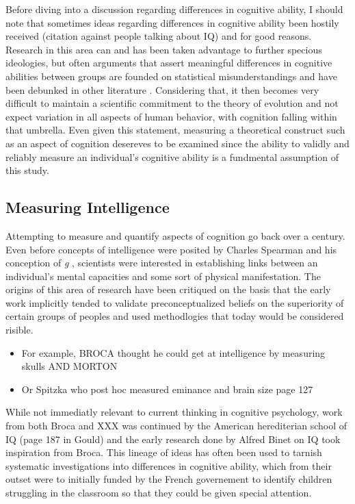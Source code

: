 \documentclass[]{book}
\providecommand{\tightlist}{%
  \setlength{\itemsep}{0pt}\setlength{\parskip}{0pt}}
\theoremstyle{definition}
\theoremstyle{definition}
\theoremstyle{definition}
\theoremstyle{remark}
\begin{document}
Before diving into a discussion regarding differences in cognitive
ability, I should note that sometimes ideas regarding differences in
cognitive ability been hostily received (citation against people talking
about IQ) and for good reasons. Research in this area can and has been
taken advantage to further specious ideologies, but often arguments that
assert meaningful differences in cognitive abilities between groups are
founded on statistical misunderstandings and have been debunked in other
literature \citep{gouldMismeasureMan1996}. Considering that, it then
becomes very difficult to maintain a scientific commitment to the theory
of evolution \citep{darwinOriginSpecies1859} and not expect variation in
all aspects of human behavior, with cognition falling within that
umbrella. Even given this statement, measuring a theoretical construct
such as an aspect of cognition desereves to be examined since the
ability to validly and reliably measure an individual's cognitive
ability is a fundmental assumption of this study.

\hypertarget{measuring-intelligence}{%
\subsection{Measuring Intelligence}\label{measuring-intelligence}}

Attempting to measure and quantify aspects of cognition go back over a
century. Even before concepts of intelligence were posited by Charles
Spearman and his conception of \emph{g}
\citep{spearmanGeneralIntelligenceObjectively1904}, scientists were
interested in establishing links between an individual's mental
capacities and some sort of physical manifestation. The origins of this
area of research have been critiqued on the basis that the early work
implicitly tended to validate preconceptualized beliefs on the
superiority of certain groups of peoples and used methodlogies that
today would be considered risible.

\begin{itemize}
\tightlist
\item
  For example, BROCA thought he could get at intelligence by measuring
  skulls AND MORTON
\item
  Or Spitzka who post hoc measured eminance and brain size page 127
\end{itemize}

While not immediatly relevant to current thinking in cognitive
psychology, work from both Broca and XXX was continued by the American
herediterian school of IQ (page 187 in Gould) and the early research
done by Alfred Binet on IQ took inspiration from Broca. This lineage of
ideas has often been used to tarnish systematic investigations into
differences in cognitive ability, which from their outset were to
initially funded by the French governement to identify children
struggling in the classroom so that they could be given special
attention.
\end{document}
